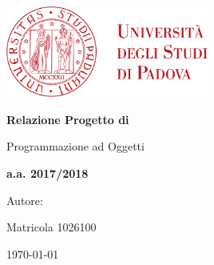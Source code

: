 \begin{titlepage} 
	\centering
	\includegraphics[width=0.50\textwidth]{img/logo.pdf}\par\vspace{1cm} %
	
	{\LARGE\bfseries Relazione Progetto di \par Programmazione ad Oggetti \par}
	\vspace{1cm}
	
	{\Large\bfseries a.a. 2017/2018 \par}
	
	\vspace{1cm} 

	Autore: \par
    {\bfseries \authorName \par} 
    Matricola 1026100 \par 
	
	\vspace{1cm}
    
    \vfill
	
	{\large \today\par}
	
\end{titlepage}
